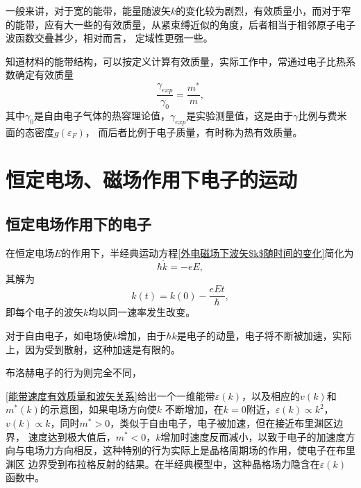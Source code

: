             一般来讲，对于宽的能带，能量随波矢$k$的变化较为剧烈，有效质量小，而对于窄的能带，应有大一些的有效质量，从紧束缚近似的角度，后者相当于相邻原子电子波函数交叠甚少，相对而言，
            定域性更强一些。

            知道材料的能带结构，可以按定义计算有效质量，实际工作中，常通过电子比热系数确定有效质量
            \begin{equation}
                \frac{\gamma_{exp}}{\gamma_0}=\frac{m^*}{m},
            \end{equation}
            其中$\gamma_0$是自由电子气体的热容理论值，$\gamma_{exp}$是实验测量值，这是由于$\gamma$比例与费米面的态密度$g(\varepsilon_F)$，
            而后者比例于电子质量，有时称为热有效质量。

    \section{恒定电场、磁场作用下电子的运动}
        \subsection{恒定电场作用下的电子}\label{subsection:恒定电场作用下的电子}
            在恒定电场$E$的作用下，半经典运动方程\autoref{外电磁场下波矢$k$随时间的变化}简化为
            \begin{equation}
                \hbar\dot{k}=-eE,
            \end{equation}
            其解为
            \begin{equation}
                k(t)=k(0)-\frac{eEt}{\hbar},
            \end{equation}
            即每个电子的波矢$k$均以同一速率发生改变。

            对于自由电子，如电场使$k$增加，由于$\hbar k$是电子的动量，电子将不断被加速，实际上，因为受到散射，这种加速是有限的。

            布洛赫电子的行为则完全不同，
            
            \autoref{能带速度有效质量和波矢关系}给出一个一维能带$\varepsilon(k)$，以及相应的$v(k)$和$m^*(k)$的示意图，如果电场方向使$k$
            不断增加，在$k=0$附近，$\varepsilon(k)\propto k^2$，$v(k)\propto k$，同时$m^*>0$，类似于自由电子，电子被加速，但在接近布里渊区边界，
            速度达到极大值后，$m^*<0$，$k$增加时速度反而减小，以致于电子的加速度方向与电场力方向相反，这种特别的行为实际上是晶格周期场的作用，使电子在布里渊区
            边界受到布拉格反射的结果。在半经典模型中，这种晶格场力隐含在$\varepsilon(k)$函数中。

